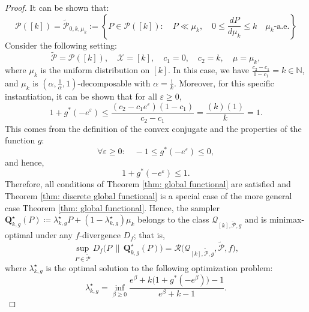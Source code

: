\documentclass[accepted]{article}
\theoremstyle{plain} %
\theoremstyle{definition}
\theoremstyle{remark}
\newcommand{\bQ}{\mathbf{Q}}
\begin{document}
\begin{proof}
 It can be shown that:
\[\mathcal{P}([k]) = \tilde{\mathcal{P}}_{0, k, \mu_k}
:= \left\{ P \in \mathcal{P}([k]) : \quad P \ll \mu_k,\quad 0 \leq \frac{dP}{d\mu_k} \leq k \quad \mu_k \text{-a.e.} \right\}
\]
Consider the following setting:  
\[
\tilde{\mathcal{P}} = \mathcal{P}([k]), \quad \mathcal{X} = [k], \quad c_1 = 0, \quad c_2 = k, \quad \mu = \mu_k,
\]
where \( \mu_k \) is the uniform distribution on \([k]\). In this case, we have \( \frac{c_2 - c_1}{1 - c_1} = k \in \mathbb{N} \), and \( \mu_k \) is \( \left(\alpha, \frac{1}{\alpha}, 1 \right) \)-decomposable with \( \alpha = \frac{1}{k} \). 
Moreover, for this specific instantiation, it can be shown that for all \( \varepsilon \geq 0 \),
\[
1 + g^*(-e^\varepsilon) \leq \frac{(c_2 - c_1 e^\varepsilon)(1 - c_1)}{c_2 - c_1} 
= \frac{(k)(1)}{k} = 1.
\]
This comes from the definition of the convex conjugate and the properties of the function \( g \):
\[
\forall \varepsilon \geq 0: \quad -1 \leq g^*(-e^\varepsilon) \leq 0,
\]
and hence,
\[
1 + g^*(-e^\varepsilon) \leq 1.
\]
Therefore, all conditions of Theorem \ref{thm: global functional} are satisfied and  Theorem \ref{thm: discrete global functional} is a special case of the more general case Theorem \ref{thm: global functional}. Hence, the sampler $
    \bQ^\star_{k,g}(P) \coloneqq \lambda^\star_{k,g} P + (1 - \lambda^\star_{k,g})\mu_k$
    belongs to the class $\mathcal{Q}_{[k], \tilde{\mathcal{P}}, g}$ and is minimax-optimal under any $f$-divergence $D_f$; that is,
    \begin{equation*}
        \sup_{P \in \tilde{\mathcal{P}}} D_f\big(P \, \| \, \bQ^\star_{k,g}(P)\big)
        = \mathcal{R}\big(\mathcal{Q}_{[k], \tilde{\mathcal{P}}, g}, \tilde{\mathcal{P}}, f\big),
    \end{equation*}
    where $\lambda^\star_{k,g}$ is the optimal solution to the following optimization problem:
    \[
    \lambda^\star_{k,g} 
    = \inf_{\beta \geq 0} 
    \frac{e^\beta + k \big( 1 + g^*(-e^\beta) \big) - 1}
         {e^\beta + k - 1}.
    \]
\end{proof}
\end{document}

